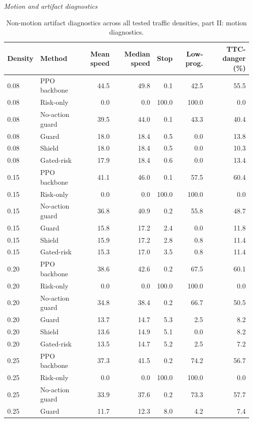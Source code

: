 \begin{table}[!htbp]
\centering
\caption{Non-motion artifact diagnostics across all tested traffic densities, part II: motion diagnostics.}
\label{tab_nonmotion_motion}
\scriptsize
\setlength{\tabcolsep}{3.2pt}
\renewcommand{\arraystretch}{1.04}
\textit{Motion and artifact diagnostics}\par
\begin{tabular}{@{}llrrrrr@{}}
\toprule
Density & Method & Mean speed & Median speed & Stop & Low-prog. & TTC-danger (\%) \\
\midrule
0.08 & PPO backbone & 44.5 & 49.8 & 0.1 & 42.5 & 55.5 \\
0.08 & Risk-only & 0.0 & 0.0 & 100.0 & 100.0 & 0.0 \\
0.08 & No-action guard & 39.5 & 44.0 & 0.1 & 43.3 & 40.4 \\
0.08 & Guard & 18.0 & 18.4 & 0.5 & 0.0 & 13.8 \\
0.08 & Shield & 18.0 & 18.4 & 0.5 & 0.0 & 10.3 \\
0.08 & Gated-risk & 17.9 & 18.4 & 0.6 & 0.0 & 13.4 \\
0.15 & PPO backbone & 41.1 & 46.0 & 0.1 & 57.5 & 60.4 \\
0.15 & Risk-only & 0.0 & 0.0 & 100.0 & 100.0 & 0.0 \\
0.15 & No-action guard & 36.8 & 40.9 & 0.2 & 55.8 & 48.7 \\
0.15 & Guard & 15.8 & 17.2 & 2.4 & 0.0 & 11.8 \\
0.15 & Shield & 15.9 & 17.2 & 2.8 & 0.8 & 11.4 \\
0.15 & Gated-risk & 15.3 & 17.0 & 3.5 & 0.8 & 11.4 \\
0.20 & PPO backbone & 38.6 & 42.6 & 0.2 & 67.5 & 60.1 \\
0.20 & Risk-only & 0.0 & 0.0 & 100.0 & 100.0 & 0.0 \\
0.20 & No-action guard & 34.8 & 38.4 & 0.2 & 66.7 & 50.5 \\
0.20 & Guard & 13.7 & 14.7 & 5.3 & 2.5 & 8.2 \\
0.20 & Shield & 13.6 & 14.9 & 5.1 & 0.0 & 8.2 \\
0.20 & Gated-risk & 13.5 & 14.7 & 5.2 & 2.5 & 7.2 \\
0.25 & PPO backbone & 37.3 & 41.5 & 0.2 & 74.2 & 56.7 \\
0.25 & Risk-only & 0.0 & 0.0 & 100.0 & 100.0 & 0.0 \\
0.25 & No-action guard & 33.9 & 37.6 & 0.2 & 73.3 & 57.7 \\
0.25 & Guard & 11.7 & 12.3 & 8.0 & 4.2 & 7.4 \\

\end{tabular}
\end{table}
